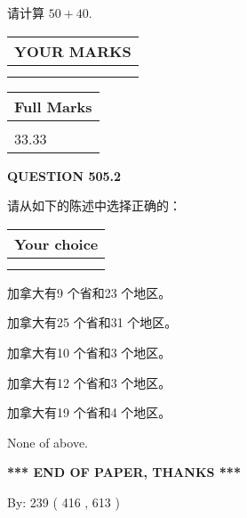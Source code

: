 \documentclass{ctexart}
\begin{document}
  
 
请计算 $ %
50 +  %
40 $.
 

 

 
  
\vspace{0.2in}
  
\noindent\begin{tabular}{|l|}
\hline
 YOUR MARKS  \\
\hline
 \\ 
 \\ 
\hline
\end{tabular}
\hspace{0.05in} \begin{tabular}{|l|}
\hline
 Full Marks  \\
\hline
 \\ 
33.33 \\
\hline
\end{tabular}
{\textbf{\Large{QUESTION
505.2 
}}}
  
  
请从如下的陈述中选择正确的：
  
  
\noindent\hspace{3.0in} \begin{tabular}{|l|}
\hline
Your choice \\
\hline
 \\ 
 \\ 
\hline
\end{tabular}
  
  
 
 
加拿大有9 个省和23 个地区。
 
 
加拿大有25 个省和31 个地区。
 
 
加拿大有10 个省和3 个地区。
 
 
加拿大有12 个省和3 个地区。
 
 
加拿大有19 个省和4 个地区。
 
 
 None of above.
 
 
   
   
 \vspace{0.2in}
 
   
   
   
   
\vspace{1.0in} 
{\textbf{\large{ *** END OF PAPER, THANKS *** }}} 
   
   
\hspace{1.0in} By: 
 239 ( 416 ,  613 )
   
\end{document}
